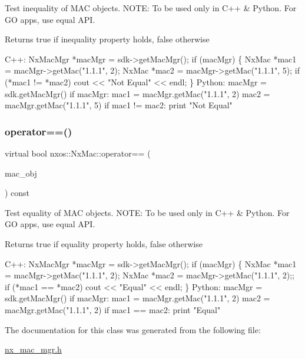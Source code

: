 Test inequality of M\+AC objects. N\+O\+TE\+: To be used only in C++ \& Python. For GO apps, use equal A\+PI.

\begin{DoxyReturn}{Returns}
true if inequality property holds, false otherwise
\end{DoxyReturn}

\begin{DoxyCode}
C++:
    NxMacMgr *macMgr = sdk->getMacMgr();
    \textcolor{keywordflow}{if} (macMgr) \{
        NxMac *mac1 = macMgr->getMac(\textcolor{stringliteral}{"1.1.1"}, 2);
        NxMac *mac2 = macMgr->getMac(\textcolor{stringliteral}{"1.1.1"}, 5);
        \textcolor{keywordflow}{if} (*mac1 != *mac2)
            cout << \textcolor{stringliteral}{"Not Equal"} << endl;
    \}
Python:
    macMgr = sdk.getMacMgr()
    \textcolor{keywordflow}{if} macMgr:
       mac1 = macMgr.getMac(\textcolor{stringliteral}{"1.1.1"}, 2)
       mac2 = macMgr.getMac(\textcolor{stringliteral}{"1.1.1"}, 5)
       \textcolor{keywordflow}{if} mac1 != mac2:
          print \textcolor{stringliteral}{"Not Equal"}
\end{DoxyCode}
 \mbox{\label{classnxos_1_1_nx_mac_ae6ebe78a6679fb460e2ed1f18c08acd0}} 
\subsubsection{\texorpdfstring{operator==()}{operator==()}}
{\footnotesize\ttfamily virtual bool nxos\+::\+Nx\+Mac\+::operator== (\begin{DoxyParamCaption}\item[{\mbox{\hyperlink{classnxos_1_1_nx_mac}{Nx\+Mac}} const \&}]{mac\+\_\+obj }\end{DoxyParamCaption}) const\hspace{0.3cm}{\ttfamily [pure virtual]}}

Test equality of M\+AC objects. N\+O\+TE\+: To be used only in C++ \& Python. For GO apps, use equal A\+PI.

\begin{DoxyReturn}{Returns}
true if equality property holds, false otherwise
\end{DoxyReturn}

\begin{DoxyCode}
C++:
    NxMacMgr *macMgr = sdk->getMacMgr();
    \textcolor{keywordflow}{if} (macMgr) \{
        NxMac *mac1 = macMgr->getMac(\textcolor{stringliteral}{"1.1.1"}, 2);
        NxMac *mac2 = macMgr->getMac(\textcolor{stringliteral}{"1.1.1"}, 2);;
        \textcolor{keywordflow}{if} (*mac1 == *mac2)
            cout << \textcolor{stringliteral}{"Equal"} << endl;
    \}
Python:
    macMgr = sdk.getMacMgr()
    \textcolor{keywordflow}{if} macMgr:
       mac1 = macMgr.getMac(\textcolor{stringliteral}{"1.1.1"}, 2)
       mac2 = macMgr.getMac(\textcolor{stringliteral}{"1.1.1"}, 2)
       \textcolor{keywordflow}{if} mac1 == mac2:
          print \textcolor{stringliteral}{"Equal"}
\end{DoxyCode}
 

The documentation for this class was generated from the following file\+:\begin{DoxyCompactItemize}
\item 
\mbox{\hyperlink{nx__mac__mgr_8h}{nx\+\_\+mac\+\_\+mgr.\+h}}\end{DoxyCompactItemize}

